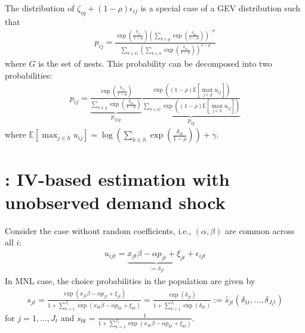 \documentclass[11pt]{elegantbook}
\begin{document}
The distribution of $\zeta_{ig}+(1-\rho)\epsilon_{ij}$ is a special case of a GEV distribution such that
\begin{equation}
    \begin{aligned}
        p_{ij}=\frac{\exp\left(\frac{\delta_{ij}}{1-\rho}\right)\left(\sum_{k\in g}\exp\left(\frac{\delta_{ik}}{1-\rho}\right)\right)^{-\rho}}{\sum_{h \in G}\left(\sum_{k\in h}\exp\left(\frac{\delta_{ik}}{1-\rho}\right)\right)^{1-\rho}}
    \end{aligned}
    \nonumber
\end{equation}
where $G$ is the set of nests. This probability can be decomposed into two probabilities:
\begin{equation}
    \begin{aligned}
        p_{ij}=\underbrace{\frac{\exp\left(\frac{\delta_{ij}}{1-\rho}\right)}{\sum_{k\in g}\exp\left(\frac{\delta_{ik}}{1-\rho}\right)}}_{p_{ij|g}}\underbrace{\frac{\exp\left((1-\rho)\mathbb{E}[\max_{j\in g}u_{ij}]\right)}{\sum_{h \in G}\exp\left((1-\rho)\mathbb{E}[\max_{j\in h}u_{ij}]\right)}}_{p_{ig}}
    \end{aligned}
    \nonumber
\end{equation}
where $\mathbb{E}[\max_{j\in h}u_{ij}]=\log\left(\sum_{k\in h}\exp\left(\frac{\delta_{ik}}{1-\rho}\right)\right)+\gamma$.

\section{\cite{berry1994estimating}: IV-based estimation with unobserved demand shock}
Consider the case without random coefficients, i.e., $(\alpha,\beta)$ are common across all $i$:
\begin{equation}
    \begin{aligned}
        u_{ijt}=\underbrace{x_{jt}\beta-\alpha p_{jt}+\xi_{jt}}_{:=\delta_{jt}}+\epsilon_{ijt}
    \end{aligned}
    \nonumber
\end{equation}
In MNL case, the choice probabilities in the population are given by
\begin{equation}
    \begin{aligned}
        s_{jt}=\frac{\exp(x_{jt}\beta-\alpha p_{jt}+\xi_{jt})}{1+\sum_{k=1}^{J_t}\exp(x_{kt}\beta-\alpha p_{kt}+\xi_{kt})}=\frac{\exp(\delta_{jt})}{1+\sum_{k=1}^{J_t}\exp(\delta_{kt})}:=\hat{s}_{jt}(\delta_{1t},...,\delta_{J_tt})
    \end{aligned}
    \label{eq:s_jt}
\end{equation}
for $j=1,...,J_t$ and $s_{0t}=\frac{1}{1+\sum_{k=1}^{J_t}\exp(x_{kt}\beta-\alpha p_{kt}+\xi_{kt})}$.
\end{document}
